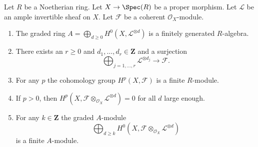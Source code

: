 \begin{lemma}
\label{lemma-coherent-proper-ample}
Let $R$ be a Noetherian ring. Let $X \to \Spec(R)$ be a proper morphism.
Let $\mathcal{L}$ be an ample invertible sheaf on $X$. Let $\mathcal{F}$
be a coherent $\mathcal{O}_X$-module.
\begin{enumerate}
\item The graded ring
$A = \bigoplus_{d \geq 0} H^0(X, \mathcal{L}^{\otimes d})$
is a finitely generated $R$-algebra.
\item There exists an $r \geq 0$ and
$d_1, \ldots, d_r \in \mathbf{Z}$ and a surjection
$$
\bigoplus\nolimits_{j = 1, \ldots, r} \mathcal{L}^{\otimes d_j}
\longrightarrow \mathcal{F}.
$$
\item For any $p$ the cohomology group $H^p(X, \mathcal{F})$ is a finite
$R$-module.
\item If $p > 0$, then
$H^p(X, \mathcal{F} \otimes_{\mathcal{O}_X} \mathcal{L}^{\otimes d}) = 0$
for all $d$ large enough.
\item For any $k \in \mathbf{Z}$ the graded $A$-module
$$
\bigoplus\nolimits_{d \geq k}
H^0(X, \mathcal{F} \otimes_{\mathcal{O}_X} \mathcal{L}^{\otimes d})
$$
is a finite $A$-module.
\end{enumerate}
\end{lemma}


